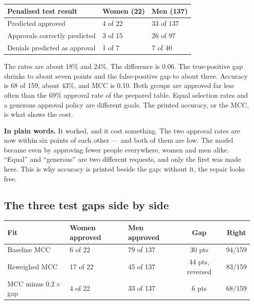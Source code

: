 \documentclass[11pt]{article}
\newcommand{\pct}[1]{\mbox{#1\%}}
\begin{document}
\begin{table}[H]
\centering
\small
\begin{tabularx}{\textwidth}{@{}l Y Y@{}}
\toprule
Penalised test result & Women (22) & Men (137) \\
\midrule
Predicted approved & 4 of 22 & 33 of 137 \\
Approvals correctly predicted & 3 of 15 & 26 of 97 \\
Denials predicted as approval & 1 of 7 & 7 of 40 \\
\bottomrule
\end{tabularx}
\end{table}

The rates are about \pct{18} and \pct{24}. The difference is 0.06. The true-positive gap shrinks to about seven points and the false-positive gap to about three. Accuracy is 68 of 159, about \pct{43}, and MCC is 0.10. Both groups are approved far less often than the \pct{69} approval rate of the prepared table. Equal selection rates and a generous approval policy are different goals. The printed accuracy, or the MCC, is what shows the cost.

\begin{plainwords}
\textbf{In plain words.} It worked, and it cost something. The two approval rates are now within six points of each other --- and both of them are low. The model became even by approving fewer people everywhere, women and men alike. ``Equal'' and ``generous'' are two different requests, and only the first was made here. This is why accuracy is printed beside the gap: without it, the repair looks free.
\end{plainwords}

\subsection{The three test gaps side by side}

\begin{table}[H]
\centering
\small
\begin{tabularx}{\textwidth}{@{}l Y Y c c@{}}
\toprule
Fit & Women approved & Men approved & Gap & Right \\
\midrule
Baseline MCC & 6 of 22 & 79 of 137 & 30 pts & 94/159 \\
Reweighed MCC & 17 of 22 & 45 of 137 & 44 pts, reversed & 83/159 \\
MCC minus \(0.2\times\)gap & 4 of 22 & 33 of 137 & 6 pts & 68/159 \\
\bottomrule
\end{tabularx}
\end{table}
\end{document}
